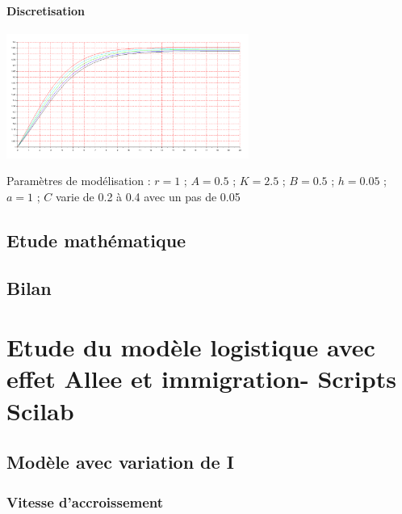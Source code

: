 \documentclass{article}
\begin{document}
\paragraph{Discretisation}
\begin{center}
\includegraphics[width=300px]{img/part2/TrajC.png}
\end{center}
Paramètres de modélisation :  $r=1$ ; $A=0.5$ ; $K=2.5$ ; $B=0.5$ ; $h=0.05$ ; $a=1$ ; $C$ varie de 0.2 à 0.4 avec un pas de 0.05
\paragraph{}

\subsection{Etude mathématique}

\subsection{Bilan}
\paragraph{}


\newpage
\appendix

\section{Etude du modèle logistique avec effet Allee et immigration- Scripts Scilab}

\subsection{Modèle avec variation de I}

\subsubsection{Vitesse d'accroissement}
\end{document}
